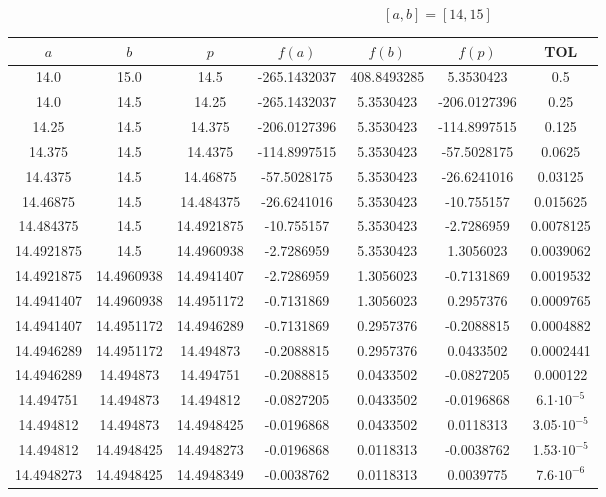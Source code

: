 \documentclass[12pt]{article}
\begin{document}
\begin{enumerate}
\begin{enumerate}
            \[[a,b] = [14, 15]\]
            \begin{center}
            \begin{tabular}{|c|c|c|c|c|c|c|}
            \hline
            \(a\) & \(b\)& \(p\)&\(f(a)\) & \(f(b)\) & \(f(p)\)&\textbf{TOL} \\
            \hline
            14.0 & 15.0 & 14.5 & -265.1432037 & 408.8493285 & 5.3530423 & 0.5 \\
            14.0 & 14.5 & 14.25 & -265.1432037 & 5.3530423 & -206.0127396 & 0.25 \\
            14.25 & 14.5 & 14.375 & -206.0127396 & 5.3530423 & -114.8997515 & 0.125 \\
            14.375 & 14.5 & 14.4375 & -114.8997515 & 5.3530423 & -57.5028175 & 0.0625 \\
            14.4375 & 14.5 & 14.46875 & -57.5028175 & 5.3530423 & -26.6241016 & 0.03125 \\
            14.46875 & 14.5 & 14.484375 & -26.6241016 & 5.3530423 & -10.755157 & 0.015625 \\
            14.484375 & 14.5 & 14.4921875 & -10.755157 & 5.3530423 & -2.7286959 & 0.0078125 \\
            14.4921875 & 14.5 & 14.4960938 & -2.7286959 & 5.3530423 & 1.3056023 & 0.0039062 \\
            14.4921875 & 14.4960938 & 14.4941407 & -2.7286959 & 1.3056023 & -0.7131869 & 0.0019532 \\
            14.4941407 & 14.4960938 & 14.4951172 & -0.7131869 & 1.3056023 & 0.2957376 & 0.0009765 \\
            14.4941407 & 14.4951172 & 14.4946289 & -0.7131869 & 0.2957376 & -0.2088815 & 0.0004882 \\
            14.4946289 & 14.4951172 & 14.494873 & -0.2088815 & 0.2957376 & 0.0433502 & 0.0002441 \\
            14.4946289 & 14.494873 & 14.494751 & -0.2088815 & 0.0433502 & -0.0827205 & 0.000122 \\
            14.494751 & 14.494873 & 14.494812 & -0.0827205 & 0.0433502 & -0.0196868 & 6.1\(\cdot 10^{-5}\) \\
            14.494812 & 14.494873 & 14.4948425 & -0.0196868 & 0.0433502 & 0.0118313 & 3.05\(\cdot 10^{-5}\) \\
            14.494812 & 14.4948425 & 14.4948273 & -0.0196868 & 0.0118313 & -0.0038762 & 1.53\(\cdot 10^{-5}\) \\
            14.4948273 & 14.4948425 & 14.4948349 & -0.0038762 & 0.0118313 & 0.0039775 & 7.6\(\cdot 10^{-6}\) \\

\end{tabular}
\end{center}
\end{enumerate}
\end{enumerate}
\end{document}
